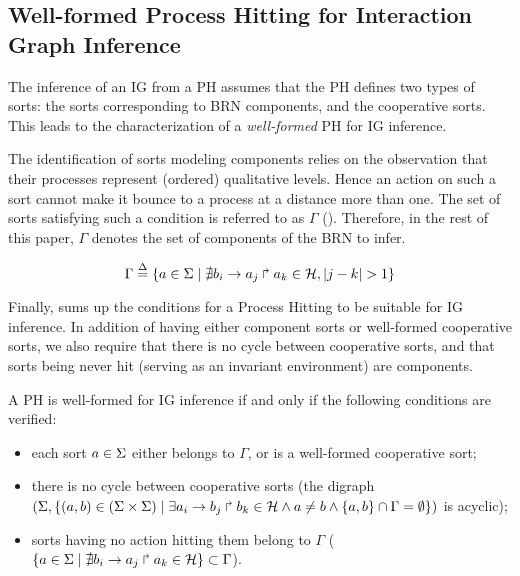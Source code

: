 \subsection{Well-formed Process Hitting for Interaction Graph Inference}\label{ssec:wf}


The inference of an IG from a PH assumes that the PH defines two types of sorts:
the sorts corresponding to BRN components, and the cooperative sorts.
This leads to the characterization of a \emph{well-formed} PH for IG inference.

The identification of sorts modeling components relies on the observation that their processes
represent (ordered) qualitative levels.
Hence an action on such a sort cannot make it bounce to a process at a distance more than one.
The set of sorts satisfying such a condition is referred to as $\Gamma$
().
Therefore, in the rest of this paper, $\Gamma$ denotes the set of components of the BRN to infer.

\begin{equation}
\Gamma \stackrel{\Delta}= \{a \in \Sigma \mid \nexists b_i\rightarrow a_j\Rsh a_k \in \mathcal{H}, |j - k| > 1\} \\
\label{eq:PH-components}
\end{equation}



Finally,  sums up the conditions for a Process Hitting to be suitable for IG
inference.
In addition of having either component sorts or well-formed cooperative sorts, we also require that
there is no cycle between cooperative sorts, and that
sorts being never hit (\ie serving as an invariant environment) are components.

\begin{property}\label{pro:wf-ph}
A PH is well-formed for IG inference if and only if the following conditions are verified:
\begin{itemize}
\item 
each sort $a\in\Sigma$ either belongs to $\Gamma$, or is a well-formed cooperative sort;
\item 
there is no cycle between cooperative sorts
(the digraph $(\Sigma,\{(a,b)\in(\Sigma\times\Sigma)\mid \exists a_i\rightarrow b_j\Rsh b_k\in\mathcal{H}
\wedge a\neq b\wedge \{a,b\}\cap\Gamma=\emptyset \})$ is
acyclic);
\item 
sorts having no action hitting them belong to $\Gamma$
($\{ a \in \Sigma\mid \nexists b_i\rightarrow a_j\Rsh a_k\in\mathcal{H}\} \subset \Gamma$).
\end{itemize}
\end{property}

